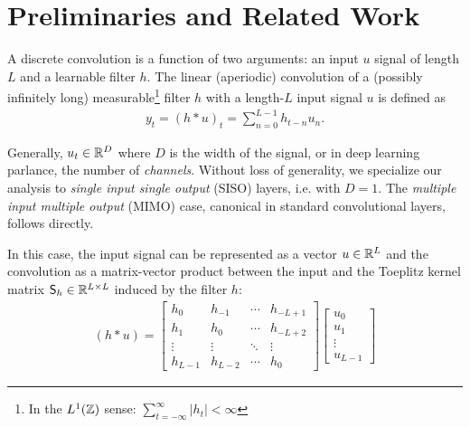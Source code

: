 \section{Preliminaries and Related Work}\label{back}
% 
A discrete convolution is a function of two arguments: an input $u$ signal of length $L$ and a learnable filter $h$. The linear (aperiodic) convolution of a (possibly infinitely long) measurable\footnote{In the $L^1(\mathbb{Z})$ sense: $\sum_{t=-\infty}^\infty |h_t|<\infty$} filter $h$ with a length-$L$ input signal $u$ is defined as
%
\begin{equation}\label{eq:cnn}
    \begin{aligned} 
        y_t = (h * u)_t = \sum_{n=0}^{L-1} h_{t -n} u_n.
    \end{aligned}
\end{equation}
%

Generally, $u_t\in\mathbb{R}^D$ where $D$ is the width of the signal, or in deep learning parlance, the number of \textit{channels}. Without loss of generality, we specialize our analysis to \textit{single input single output} (SISO) layers, i.e. with $D=1$. The \textit{multiple input multiple output} (MIMO) case, canonical in standard convolutional layers, follows directly.
%

In this case, the input signal can be represented as a vector $u\in\mathbb{R}^L$ and the convolution as a matrix-vector product between the input and the Toeplitz kernel matrix $\mathsf{S}_h \in \mathbb{R}^{L \times L}$ induced by the filter $h$:
%
\begin{equation}\label{eq:cnn_matvec}
    \begin{aligned} 
        (h * u) = 
        \begin{bmatrix}
            h_0 & h_{-1} & \cdots & h_{-L+1} \\
            h_1 & h_0 & \cdots & h_{-L+2} \\
            \vdots & \vdots & \ddots & \vdots \\
            h_{L-1} & h_{L-2} & \cdots & h_{0}
        \end{bmatrix}
        \begin{bmatrix}
            u_0\\
            u_1\\
            \vdots\\
            u_{L-1}
        \end{bmatrix}
    \end{aligned}
\end{equation}
%
